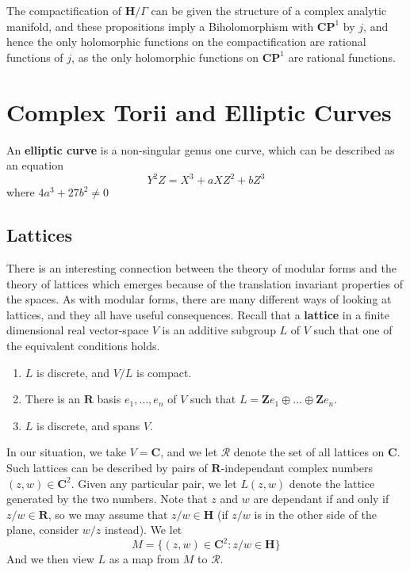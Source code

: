 The compactification of $\mathbf{H}/\Gamma$ can be given the structure of a complex analytic manifold, and these propositions imply a Biholomorphism with $\mathbf{C} \mathbf{P}^1$ by $j$, and hence the only holomorphic functions on the compactification are rational functions of $j$, as the only holomorphic functions on $\mathbf{C} \mathbf{P}^1$ are rational functions.










\chapter{Complex Torii and Elliptic Curves}

An {\bf elliptic curve} is a non-singular genus one curve, which can be described as an equation
%
\[ Y^2Z = X^3 + aXZ^2 + bZ^3 \]
%
where $4a^3 + 27b^2 \neq 0$

\section{Lattices}

There is an interesting connection between the theory of modular forms and the theory of lattices which emerges because of the translation invariant properties of the spaces. As with modular forms, there are many different ways of looking at lattices, and they all have useful consequences. Recall that a {\bf lattice} in a finite dimensional real vector-space $V$ is an additive subgroup $L$ of $V$ such that one of the equivalent conditions holds.
%
\begin{enumerate}
    \item $L$ is discrete, and $V/L$ is compact.
    \item There is an $\mathbf{R}$ basis $e_1, \dots, e_n$ of $V$ such that $L = \mathbf{Z} e_1 \oplus \dots \oplus \mathbf{Z} e_n$.
    \item $L$ is discrete, and spans $V$.
\end{enumerate}
%
In our situation, we take $V = \mathbf{C}$, and we let $\mathcal{R}$ denote the set of all lattices on $\mathbf{C}$. Such lattices can be described by pairs of $\mathbf{R}$-independant complex numbers $(z,w) \in \mathbf{C}^2$. Given any particular pair, we let $L(z,w)$ denote the lattice generated by the two numbers. Note that $z$ and $w$ are dependant if and only if $z/w \in \mathbf{R}$, so we may assume that $z/w \in \mathbf{H}$ (if $z/w$ is in the other side of the plane, consider $w/z$ instead). We let
%
\[ M = \{ (z,w) \in \mathbf{C}^2 : z/w \in \mathbf{H} \} \]
%
And we then view $L$ as a map from $M$ to $\mathcal{R}$.

